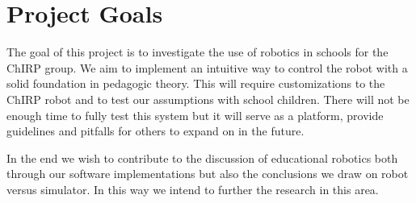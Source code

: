 \section{Project Goals}
The goal of this project is to investigate the use of robotics in schools for the ChIRP group. We aim to implement an intuitive way to control the robot with a solid foundation in pedagogic theory. This will require customizations to the ChIRP robot and to test our assumptions with school children. There will not be enough time to fully test this system but it will serve as a platform, provide guidelines and pitfalls for others to expand on in the future. 

\bigskip\noindent
In the end we wish to contribute to the discussion of educational robotics both through our software implementations but also the conclusions we draw on robot versus simulator. In this way we intend to further the research in this area. 


